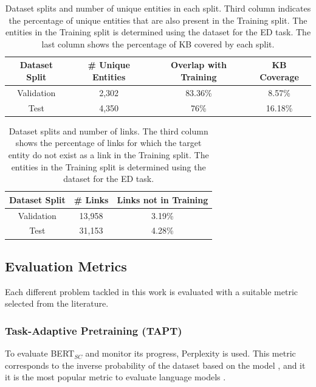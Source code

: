 \documentclass{report}
\theoremstyle{definition}
\theoremstyle{remark}
\begin{document}
\begin{table}[H]
    \centering
    \begin{tabular}{cccc}
    Dataset Split & \# Unique Entities & Overlap with Training & KB Coverage\\
    \hline
    Validation & 2,302 & 83.36\% & 8.57\%\\
    Test & 4,350 & 76\%& 16.18\%\\
    \end{tabular}
    \caption{Dataset splits and number of unique entities in each split. Third column indicates the percentage of unique entities that are also present in the Training split. The entities in the Training split is determined using the dataset for the ED task. The last column shows the percentage of KB covered by each split.}
    \label{tab:goldstatsel2}
\end{table}

\begin{table}[H]
    \centering
    \begin{tabular}{ccc}
    Dataset Split & \# Links & Links not in Training\\
    \hline
    Validation &  13,958 & 3.19\% \\
    Test &            31,153 & 4.28\% \\
    \end{tabular}
    \caption{Dataset splits and number of links. The third column shows the percentage of links for which the target entity do not exist as a link in the Training split. The entities in the Training split is determined using the dataset for the ED task.}
    \label{tab:goldstatsel3}
\end{table}

\subsection{Evaluation Metrics}
\label{sec:EvalExpSetupEval}
Each different problem tackled in this work is evaluated with a suitable metric selected from the literature.
\subsubsection{Task-Adaptive Pretraining (TAPT)}
To evaluate BERT$_{SC}$ and monitor its progress, Perplexity is used. This metric corresponds to the inverse probability of the dataset based on the model \cite{perplexity}, and it it is the most popular metric to evaluate language models \cite{perplexity}. 
\end{document}
